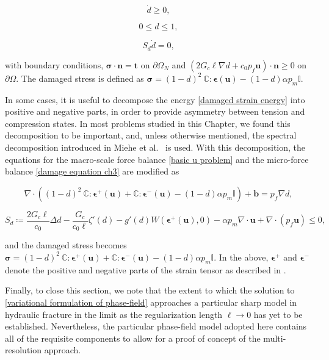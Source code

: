 \begin{equation}
    \dot{d} \ge 0,
\end{equation}

\begin{equation}
   0 \le d \le 1,
\end{equation}

\begin{equation}
    S_d\dot{d} = 0,
    \label{eq:ddot-strong}
\end{equation}

\noindent with boundary conditions, $\boldsymbol\sigma \cdot \textbf{n} = \textbf{t}$ on $\partial \Omega_N$ and $(2G_c\ell\nabla d +c_0p_f\textbf{u})\cdot \textbf{n} \ge 0$ on $\partial \Omega$. The damaged stress is defined as $\boldsymbol\sigma = (1-d)^2\ \mathbb{C}:\boldsymbol\epsilon(\textbf{u}) -(1-d)\alpha p_m \mathbb{I}$.

In some cases, it is useful to decompose the energy \eqref{damaged strain energy} into positive and negative parts, in order to provide asymmetry between tension and compression states. In most problems studied in this Chapter, we found this decomposition to be important, and, unless otherwise mentioned, the spectral decomposition introduced in Miehe et al.~\cite{miehe2010phase} is used. With this decomposition, the equations for the macro-scale force balance \eqref{basic u problem} and the micro-force balance \eqref{damage equation ch3} are modified as

\begin{equation}\label{basic u problem spectral}\tag{3.22a}
    \nabla \cdot \left( (1-d)^2\ \mathbb{C}:\boldsymbol\epsilon^+(\textbf{u}) + \mathbb{C}:\boldsymbol\epsilon^-(\textbf{u})-(1-d)\alpha p_m \mathbb{I}\right) + \textbf{b} = p_f\nabla d, 
\end{equation}

\begin{equation}\label{damage equation spectral}\tag{3.23a}
    S_d \coloneqq  \dfrac{2G_c\ell}{c_0}\Delta d - \dfrac{G_c}{c_0\ell}\zeta'(d)-g'(d)W(\boldsymbol{\epsilon^+}(\boldsymbol{\textbf{u}}),0) - \alpha p_m\nabla \cdot \textbf{u} + \nabla \cdot (p_f\textbf{u}) \le 0,
\end{equation}

\noindent and the damaged stress becomes $\boldsymbol\sigma = (1-d)^2\ \mathbb{C}:\boldsymbol\epsilon^+(\textbf{u}) + \mathbb{C}:\boldsymbol\epsilon^-(\textbf{u})-(1-d)\alpha p_m \mathbb{I}$. In the above, $\boldsymbol\epsilon^+$ and $\boldsymbol\epsilon^-$ denote the positive and negative parts of the strain tensor as described in \cite{miehe2010phase}. 

Finally, to close this section, we note that the extent to which the solution to \eqref{variational formulation of phase-field} approaches a particular sharp model in hydraulic fracture in the limit as the regularization length $\ell\rightarrow 0$ has yet to be established.  Nevertheless, the particular phase-field model adopted here contains all of the requisite components to allow for a proof of concept of the multi-resolution approach.  




